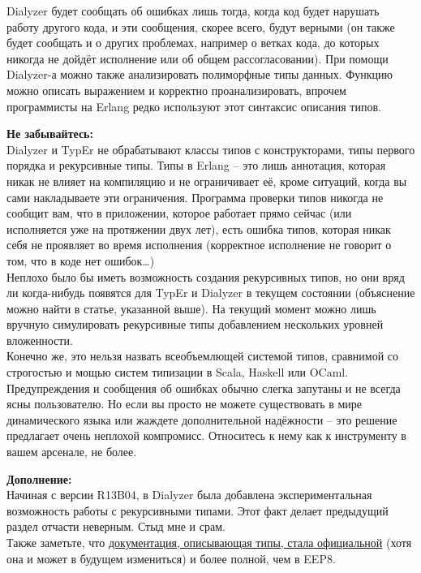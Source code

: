 Dialyzer будет сообщать об ошибках лишь тогда, когда код будет нарушать работу другого кода, и эти сообщения, скорее всего, будут верными (он также будет сообщать и о других проблемах, например о ветках кода, до которых никогда не дойдёт исполнение или об общем рассогласовании).
При помощи Dialyzer\--а можно также анализировать полиморфные типы данных.
Функцию  можно описать выражением  и корректно проанализировать, впрочем программисты на Erlang редко используют этот синтаксис описания типов.\\
\colorbox{lorange}
{
    \begin{minipage}{\linewidth}
        \textbf{Не забывайтесь:}\\
Dialyzer и TypEr не обрабатывают классы типов с конструкторами, типы первого порядка и рекурсивные типы.
Типы в Erlang \--- это лишь аннотация, которая никак не влияет на компиляцию и не ограничивает её, кроме ситуаций, когда вы сами накладываете эти ограничения.
Программа проверки типов никогда не сообщит вам, что в приложении, которое работает прямо сейчас (или исполняется уже на протяжении двух лет), есть ошибка типов, которая никак себя не проявляет во время исполнения (корректное исполнение не говорит о том, что в коде нет ошибок\ldots)\\
Неплохо было бы иметь возможность создания рекурсивных типов, но они вряд ли когда\--нибудь появятся для TypEr и Dialyzer в текущем состоянии (объяснение можно найти в статье, указанной выше).
На текущий момент можно лишь вручную симулировать рекурсивные типы добавлением нескольких уровней вложенности.\\
Конечно же, это нельзя назвать  всеобъемлющей системой типов, сравнимой со строгостью и мощью систем типизации в Scala, Haskell или OCaml.
Предупреждения и сообщения об ошибках обычно слегка запутаны и не всегда ясны пользователю.
Но если вы просто не можете существовать в мире динамического языка или жаждете дополнительной надёжности \--- это решение предлагает очень неплохой компромисс.
Относитесь к нему как к инструменту в вашем арсенале, не более.
    \end{minipage}
}
\colorbox{lgray}
{
    \begin{minipage}{\linewidth}
\textbf{Дополнение:}\\
Начиная с версии R13B04, в Dialyzer была добавлена экспериментальная возможность работы с рекурсивными типами.
Этот факт делает предыдущий раздел отчасти неверным.
Стыд мне и срам.\\
Также заметьте, что \href{http://erlang.org/doc/reference\_manual/typespec.html}{документация, описывающая типы, стала официальной} (хотя она и может в будущем измениться) и более полной, чем в EEP8.
    \end{minipage}
}
